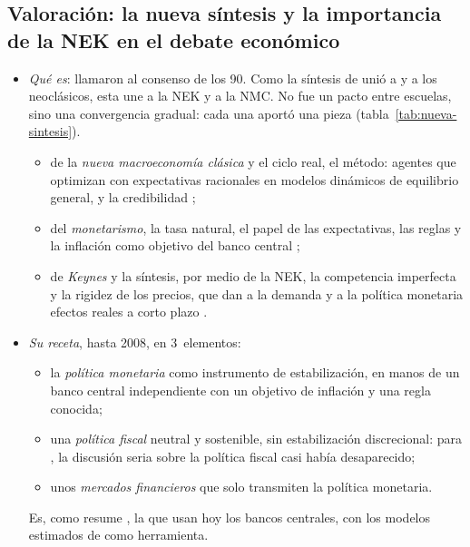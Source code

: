 \documentclass[11pt]{article}
\begin{document}
\subsection{Valoración: la nueva síntesis y la importancia de la NEK en el debate económico}\label{sec:nueva-sintesis}

\begin{itemize}
\item \emph{Qué es}: \textcite{GoodfriendKing1997New} llamaron  al consenso de los 90. Como la síntesis de  unió a  y a los neoclásicos, esta une a la NEK y a la NMC. No fue un pacto entre escuelas, sino una convergencia gradual\nocite{Woodford2009Convergence}: cada una aportó una pieza (tabla~\ref{tab:nueva-sintesis}).
  \begin{itemize}
  \item de la \emph{nueva macroeconomía clásica} y el ciclo real, el método: agentes que optimizan con expectativas racionales en modelos dinámicos de equilibrio general, y la credibilidad\nocite{KydlandPrescott1977Rules} ;
  \item del \emph{monetarismo}, la tasa natural, el papel de las expectativas, las reglas y la inflación como objetivo del banco central ;
  \item de \emph{Keynes} y la síntesis, por medio de la NEK, la competencia imperfecta y la rigidez de los precios, que dan a la demanda y a la política monetaria efectos reales a corto plazo .
  \end{itemize}
\item \emph{Su receta}, hasta 2008, en 3~elementos:
  \begin{itemize}
  \item la \emph{política monetaria} como instrumento de estabilización, en manos de un banco central independiente con un objetivo de inflación y una regla conocida;
  \item una \emph{política fiscal} neutral y sostenible, sin estabilización discrecional: para \textcite{Solow2002Politique}, la discusión seria sobre la política fiscal casi había desaparecido;
  \item unos \emph{mercados financieros} que solo transmiten la política monetaria.
  \end{itemize}
  Es, como resume \textcite{Mankiw2006Macroeconomist}, la que usan hoy los bancos centrales, con los modelos estimados de \textcite{SmetsWouters2007Shocks} como herramienta\nocite{Blanchard2009State}.
\end{itemize}
\end{document}
